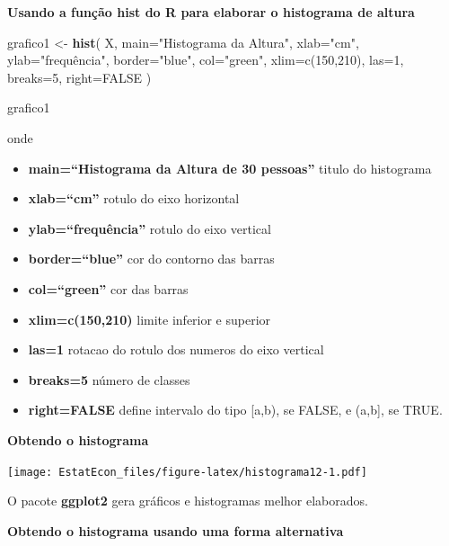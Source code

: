 \documentclass[
]{book}
\newenvironment{Shaded}{\begin{snugshade}}{\end{snugshade}}
\newcommand{\DataTypeTok}[1]{\textcolor[rgb]{0.13,0.29,0.53}{#1}}
\newcommand{\KeywordTok}[1]{\textcolor[rgb]{0.13,0.29,0.53}{\textbf{#1}}}
\newcommand{\NormalTok}[1]{#1}
\newcommand{\StringTok}[1]{\textcolor[rgb]{0.31,0.60,0.02}{#1}}
\providecommand{\tightlist}{%
  \setlength{\itemsep}{0pt}\setlength{\parskip}{0pt}}
\begin{document}
\textbf{Usando a função hist do R para elaborar o histograma de altura}

\begin{Shaded}
\begin{Highlighting}[]
\NormalTok{grafico1 <-}\StringTok{ }\KeywordTok{hist}\NormalTok{( }
\NormalTok{                  X, }
                  \DataTypeTok{main=}\StringTok{"Histograma da Altura"}\NormalTok{, }
                  \DataTypeTok{xlab=}\StringTok{"cm"}\NormalTok{, }
                  \DataTypeTok{ylab=}\StringTok{"frequência", }
\StringTok{                  border="}\NormalTok{blue}\StringTok{", }
\StringTok{                  col="}\NormalTok{green}\StringTok{", }
\StringTok{                  xlim=c(150,210), }
\StringTok{                  las=1, }
\StringTok{                  breaks=5, }
\StringTok{                  right=FALSE }
\StringTok{                ) }

\StringTok{grafico1}
\end{Highlighting}
\end{Shaded}

onde

\begin{itemize}
\tightlist
\item
  \textbf{main=``Histograma da Altura de 30 pessoas''} titulo do histograma
\item
  \textbf{xlab=``cm''} rotulo do eixo horizontal
\item
  \textbf{ylab=``frequência''} rotulo do eixo vertical
\item
  \textbf{border=``blue''} cor do contorno das barras
\item
  \textbf{col=``green''} cor das barras
\item
  \textbf{xlim=c(150,210)} limite inferior e superior
\item
  \textbf{las=1} rotacao do rotulo dos numeros do eixo vertical
\item
  \textbf{breaks=5} número de classes
\item
  \textbf{right=FALSE} define intervalo do tipo {[}a,b), se FALSE, e (a,b{]}, se TRUE.
\end{itemize}

\textbf{Obtendo o histograma}

\texttt{[image: EstatEcon\_files/figure-latex/histograma12-1.pdf]}

O pacote \textbf{ggplot2} gera gráficos e histogramas melhor elaborados.

\textbf{Obtendo o histograma usando uma forma alternativa}
\end{document}
